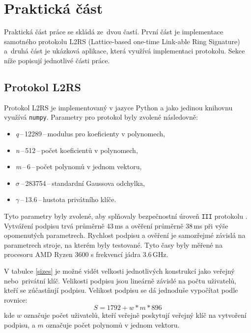 
\newcommand{\param}[2]{\textit{#1}\,--\,#2\,--\,}
\newcommand{\paramnott}[2]{#1\,--\,#2\,--\,}

\chapter{Praktická část}
Praktická část práce se skládá ze~dvou častí. První část je implementace samotného protokolu L2RS (Lattice-based one-time Link-able Ring Signature) a~druhá část je ukázková aplikace, která využívá implementaci protokolu. Sekce níže popisují jednotlivé části práce.

\section{Protokol L2RS}
Protokol L2RS je implementovaný v jazyce Python a jako jedinou knihovnu využívá \texttt{numpy}. Parametry pro protokol byly zvolené následovně:

\begin{itemize}
  \item \param{q}{12289}modulus pro koeficienty v polynomech,
  \item \param{n}{512}počet koeficientů v polynomech,
  \item \param{m}{6}počet polynomů v jednom vektoru,
  \item \paramnott{$\sigma$}{283754}standardní Gaussova odchylka,
  \item \paramnott{$\gamma$}{13.6}hustota privátního klíče.
\end{itemize}

Tyto parametry byly zvolené, aby splňovaly bezpečnostní úroveň \texttt{III} protokolu \cite{Torres2018}. Vytváření podpisu trvá průměrně 43\,ms a ověření průměrně 38\,ms při výše opomenutých parametrech. Rychlost podpisu a ověření je samozřejmé závislá na parametrech stroje, na kterém byly testované. Tyto časy byly měřené na procesoru AMD Ryzen 3600 s frekvencí jádra 3.6\,GHz.

V tabulce \ref{sizes} je možné vidět velkosti jednotlivých konstrukcí jako veřejný nebo~privátní klíč. Velikosti podpisu jsou lineárně závislé na počtu uživatelů, kteří se zúčastňují podpisu. Velikost podpisu se dá jednoduše vypočítat podle rovnice:
\begin{equation}
  S=1792+w*m*896
\end{equation}
kde $w$ označuje počet uživatelů, kteří veřejně poskytují veřejný klíč na vytvoření podpisu, a $m$ označuje počet polynomů v jednom vektoru.


